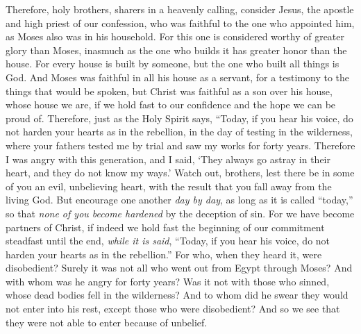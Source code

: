 \begin{biblechapter} %
 Therefore, holy brothers, sharers in a heavenly calling, consider Jesus, the apostle and high priest of our confession,
\verse who was faithful to the one who appointed him, as Moses also was in his household.
\verse For this one is considered worthy of greater glory than Moses, inasmuch as the one who builds it has greater honor than the house.
\verse For every house is built by someone, but the one who built all things is God.
\verse And Moses was faithful in all his house as a servant, for a testimony to the things that would be spoken,
\verse but Christ was faithful as a son over his house, whose house we are, if we hold fast to our confidence and the hope we can be proud of.
 Therefore, just as the Holy Spirit says,
\verse “Today, if you hear his voice,
\verse do not harden your hearts as in the rebellion, 
in the day of testing in the wilderness,
\verse where your fathers tested me by trial 
and saw my works
\verse for forty years. 
Therefore I was angry with this generation, 
and I said, ‘They always go astray in their heart, 
and they do not know my ways.’
\verse Watch out, brothers, lest there be in some of you an evil, unbelieving heart, with the result that you fall away from the living God.
\verse But encourage one another \textit{day by day}, as long as it is called “today,” so that \textit{none of you become hardened} by the deception of sin.
\verse For we have become partners of Christ, if indeed we hold fast the beginning of our commitment steadfast until the end,
\verse \textit{while it is said}, “Today, if you hear his voice, 
do not harden your hearts as in the rebellion.”
\verse For who, when they heard it, were disobedient? Surely it was not all who went out from Egypt through Moses?
\verse And with whom was he angry for forty years? Was it not with those who sinned, whose dead bodies fell in the wilderness?
\verse And to whom did he swear they would not enter into his rest, except those who were disobedient?
\verse And so we see that they were not able to enter because of unbelief.
\end{biblechapter}

